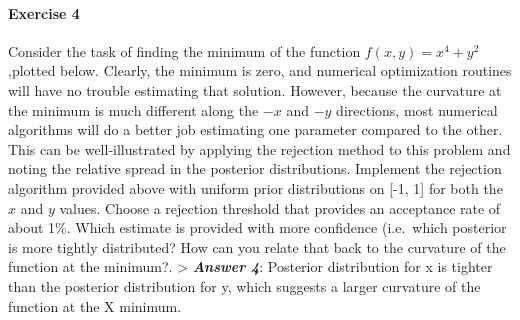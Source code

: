 \documentclass[
]{article}
\begin{document}
\paragraph{Exercise 4}\label{exercise-4}

Consider the task of finding the minimum of the function
\(f(x,y)=x^4 +y^2\),plotted below. Clearly, the minimum is zero, and
numerical optimization routines will have no trouble estimating that
solution. However, because the curvature at the minimum is much
different along the \(-x\) and \(-y\) directions, most numerical
algorithms will do a better job estimating one parameter compared to the
other. This can be well-illustrated by applying the rejection method to
this problem and noting the relative spread in the posterior
distributions. Implement the rejection algorithm provided above with
uniform prior distributions on {[}-1, 1{]} for both the \(x\) and \(y\)
values. Choose a rejection threshold that provides an acceptance rate of
about 1\%. Which estimate is provided with more confidence (i.e.~which
posterior is more tightly distributed? How can you relate that back to
the curvature of the function at the minimum?. \textgreater{}
\textbf{\emph{Answer 4}}: Posterior distribution for x is tighter than
the posterior distribution for y, which suggests a larger curvature of
the function at the X minimum.
\end{document}
